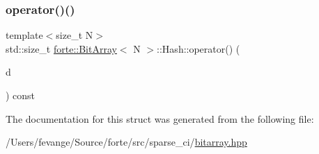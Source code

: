 \subsubsection{\texorpdfstring{operator()()}{operator()()}}
{\footnotesize\ttfamily template$<$size\+\_\+t N$>$ \\
std\+::size\+\_\+t \mbox{\hyperlink{classforte_1_1_bit_array}{forte\+::\+Bit\+Array}}$<$ N $>$\+::Hash\+::operator() (\begin{DoxyParamCaption}\item[{const \mbox{\hyperlink{classforte_1_1_bit_array}{Bit\+Array}}$<$ N $>$ \&}]{d }\end{DoxyParamCaption}) const\hspace{0.3cm}{\ttfamily [inline]}}



The documentation for this struct was generated from the following file\+:\begin{DoxyCompactItemize}
\item 
/\+Users/fevange/\+Source/forte/src/sparse\+\_\+ci/\mbox{\hyperlink{bitarray_8hpp}{bitarray.\+hpp}}\end{DoxyCompactItemize}
